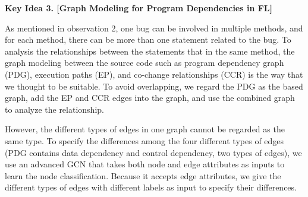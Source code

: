 {\bf Key Idea 3. [Graph Modeling for Program Dependencies in FL]} 




As mentioned in observation 2, one bug can be involved in multiple
methods, and for each method, there can be more than one statement
related to the bug. To analysis the relationships between the
statements that in the same method, the graph modeling between the
source code such as program dependency graph (PDG), execution paths
(EP), and co-change relationships (CCR) is the way that we thought to
be suitable. To avoid overlapping, we regard the PDG as the based
graph, add the EP and CCR edges into the graph, and use the combined
graph to analyze the relationship.

However, the different types of edges in one graph cannot be regarded as the same type. To specify the differences among the four different types of edges (PDG contains data dependency and control dependency, two types of edges), we use an advanced GCN \cite{li2019gcn} that takes both node and edge attributes as inputs to learn the node classification. Because it accepts edge attributes, we give the different types of edges with different labels as input to specify their differences.






